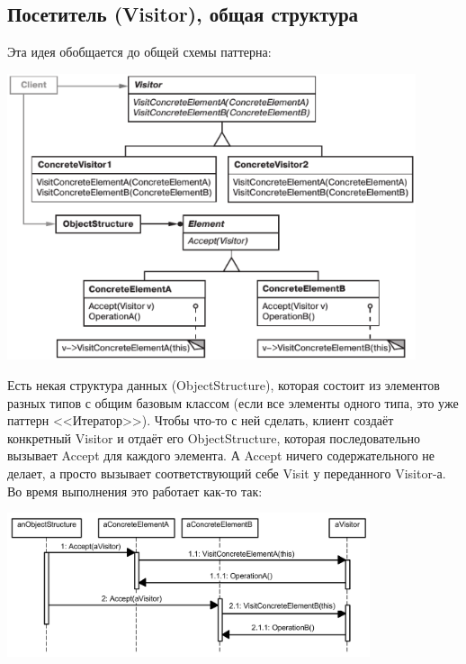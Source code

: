 \documentclass{../text-style}
\begin{document}
\subsection{Посетитель (Visitor), общая структура}

Эта идея обобщается до общей схемы паттерна:

\begin{center}
    \includegraphics[width=0.9\textwidth]{visitor.png}
\end{center}

Есть некая структура данных (ObjectStructure), которая состоит из элементов разных типов с общим базовым классом (если все элементы одного типа, это уже паттерн <<Итератор>>). Чтобы что-то с ней сделать, клиент создаёт конкретный Visitor и отдаёт его ObjectStructure, которая последовательно вызывает Accept для каждого элемента. А Accept ничего содержательного не делает, а просто вызывает соответствующий себе Visit у переданного Visitor-а. Во время выполнения это работает как-то так:

\begin{center}
    \includegraphics[width=0.8\textwidth]{doubleDispatching.png}
\end{center}
\end{document}
